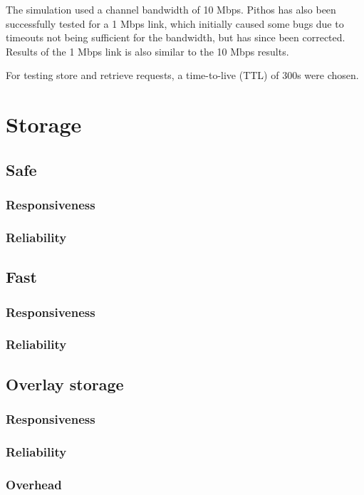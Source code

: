 The simulation used a channel bandwidth of 10 Mbps. Pithos has also been successfully tested for a 1 Mbps link, which initially caused some bugs due to timeouts not being sufficient for the bandwidth, but has since been corrected. Results of the 1 Mbps link is also similar to the 10 Mbps results.

For testing store and retrieve requests, a time-to-live (TTL) of 300s were chosen.

    \section{Storage}
            \subsection{Safe}
                \subsubsection{Responsiveness}
                
                
                \subsubsection{Reliability}
                        \label{reliability_compare_storage}
            \subsection{Fast}
                \subsubsection{Responsiveness}
                \subsubsection{Reliability}
            \subsection{Overlay storage}
                \subsubsection{Responsiveness}
                \subsubsection{Reliability}
                \subsubsection{Overhead}
